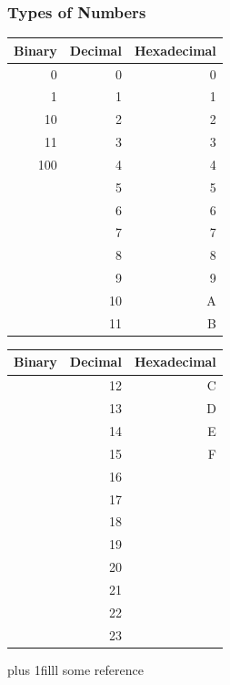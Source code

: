 \documentclass[fleqn]{beamer} %
\newcommand{\sectiontitleI}{Types of Numbers} %
\newcommand{\sectiontitleII}{Variables and Type}
\newcommand{\btVFill}{\vskip0pt plus 1filll}
\begin{document}
	
	\begin{frame}[label=sectionI] \small
	\frametitle{\sectiontitleI}
	\bigskip
	
	\begin{multicols}{2}
		\begin{tabular}{|r|r|r|} \hline
			Binary 	& Decimal 	& Hexadecimal \\ \hline
			0		& 0			& 0 		\\ \hline	
			1		& 1			& 1 		\\ \hline
			10		& 2			& 2 		\\ \hline
			11		& 3			& 3 		\\ \hline
			100		& 4			& 4 		\\ \hline
			& 5			& 5 		\\ \hline
			& 6			& 6 		\\ \hline
			& 7			& 7 		\\ \hline
			& 8			& 8 		\\ \hline
			& 9			& 9 		\\ \hline
			& 10		& A 		\\ \hline
			& 11		& B 		\\ \hline
		\end{tabular}
		
		\begin{tabular}{|r|r|r|} \hline
			Binary 	& Decimal 	& Hexadecimal \\ \hline
			& 12		& C 		\\ \hline	
			& 13		& D 		\\ \hline
			& 14		& E 		\\ \hline
			& 15		& F 		\\ \hline
			& 16		&  		\\ \hline
			& 17		&  		\\ \hline
			& 18		&  		\\ \hline
			& 19		&  		\\ \hline
			& 20		&  		\\ \hline
			& 21		&  		\\ \hline
			& 22	    &  		\\ \hline
			& 23	    &  		\\ \hline
		\end{tabular}
	\end{multicols}
	
	\btVFill
	\tiny{some reference}		
	
\end{frame}
\end{document}
